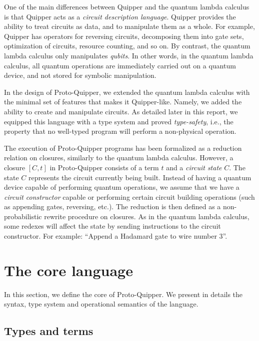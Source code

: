 \documentclass[twoside]{article}
\begin{document}
One of the main differences between Quipper and the quantum lambda
calculus is that Quipper acts as a {\em circuit description language}.
Quipper provides the ability to treat circuits as data, and to
manipulate them as a whole.  For example, Quipper has operators for
reversing circuits, decomposing them into gate sets, optimization of
circuits, resource counting, and so on. By contrast, the quantum
lambda calculus only manipulates {\em qubits}. In other words, in
the quantum lambda calculus, all quantum operations are immediately
carried out on a quantum device, and not stored for symbolic
manipulation.

In the design of Proto-Quipper, we extended the quantum lambda
calculus with the minimal set of features that makes it Quipper-like.
Namely, we added the ability to create and manipulate circuits.  As
detailed later in this report, we equipped this language with a type
system and proved {\em type-safety}, i.e., the property that no
well-typed program will perform a non-physical operation.

The execution of Proto-Quipper programs has been formalized as a
reduction relation on closures, similarly to the quantum lambda
calculus.  However, a closure $[C,t]$ in Proto-Quipper consists of a
term $t$ and a \emph{circuit state} $C$. The state $C$ represents the
circuit currently being built. Instead of having a quantum device
capable of performing quantum operations, we assume that we have a
\emph{circuit constructor} capable or performing certain circuit
building operations (such as appending gates, reversing, etc.). The
reduction is then defined as a non-probabilistic rewrite procedure on
closures.  As in the quantum lambda calculus, some redexes will affect
the state by sending instructions to the circuit constructor. For
example: ``Append a Hadamard gate to wire number 3''.


\clearpage
\section{The core language}\label{sec-core}

In this section, we define the core of Proto-Quipper. We 
present in details the syntax, type system and 
operational semantics of the language.

\subsection{Types and terms}
\label{ssec-types-and-terms}
\end{document}
